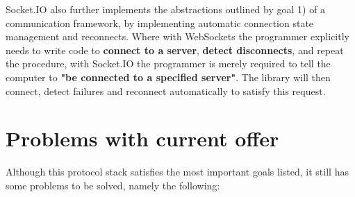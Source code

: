 \documentclass[conference]{IEEEtran}
\begin{document}
Socket.IO also further implements the abstractions outlined by goal 1) of a communication framework, by implementing automatic connection state management and reconnects. Where with WebSockets the programmer explicitly needs to write code to \textbf{connect to a server},  \textbf{detect disconnects}, and repeat the procedure, with Socket.IO the programmer is merely required to tell the computer to \textbf{"be connected to a specified server"}. The library will then connect, detect failures and reconnect automatically to satisfy this request. 


\section{Problems with current offer}

Although this protocol stack satisfies the most important goals listed, it still has some problems to be solved, namely the following:
\end{document}

